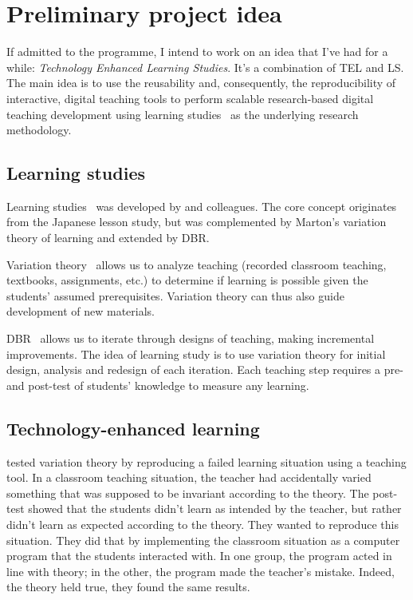 \section{Preliminary project idea}

%
%

If admitted to the programme, I intend to work on an idea that I've had for a 
while: \emph{Technology Enhanced Learning Studies}.
It's a combination of {\ac{TEL}} and {\ac{LS}}.
The main idea is to use the reusability and, consequently, the reproducibility 
of interactive, digital teaching tools to perform scalable research-based 
digital teaching development using learning studies~\autocite{LearningStudy} as 
the underlying research methodology.


\subsection{Learning studies}

Learning studies~\autocite{LearningStudy} was developed by 
\citeauthor{LearningStudy} and colleagues.
The core concept originates from the Japanese lesson study, but was 
complemented by Marton's variation theory of learning and extended by \ac{DBR}.

Variation theory~\autocite{VariationTheory} allows us to analyze teaching 
(recorded classroom teaching, textbooks, assignments, etc.) to determine if 
learning is possible given the students' assumed prerequisites.
Variation theory can thus also guide development of new materials.

\Ac{DBR}~\autocite{DesignBasedResearch} allows us to iterate through designs of 
teaching, making incremental improvements.
The idea of learning study is to use variation theory for initial design, 
analysis and redesign of each iteration.
Each teaching step requires a pre- and post-test of students' knowledge to 
measure any learning.


\subsection{Technology-enhanced learning}

\Textcite{MeaningsAreAcquired} tested variation theory by reproducing a failed 
learning situation using a teaching tool.
In a classroom teaching situation, the teacher had accidentally varied 
something that was supposed to be invariant according to the theory.
The post-test showed that the students didn't learn as intended by the teacher, 
but rather didn't learn as expected according to the theory.
They wanted to reproduce this situation.
They did that by implementing the classroom situation as a computer program 
that the students interacted with.
In one group, the program acted in line with theory; in the other, the program 
made the teacher's mistake.
Indeed, the theory held true, they found the same results.

